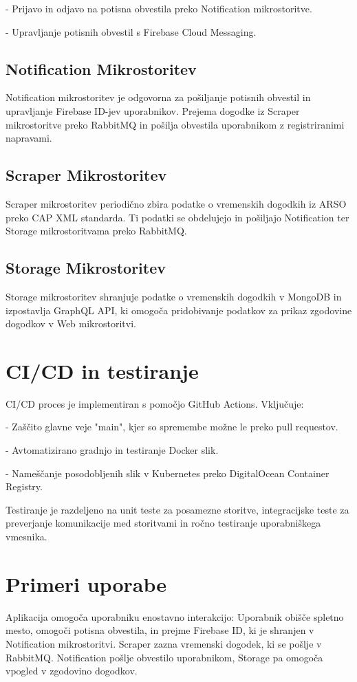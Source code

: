 \documentclass[a4paper,11pt]{article}
\begin{document}
- Prijavo in odjavo na potisna obvestila preko Notification mikrostoritve.

- Upravljanje potisnih obvestil s Firebase Cloud Messaging.

\subsection*{Notification Mikrostoritev}
Notification mikrostoritev je odgovorna za po\v{s}iljanje potisnih obvestil in upravljanje Firebase ID-jev uporabnikov. Prejema dogodke iz Scraper mikrostoritve preko RabbitMQ in po\v{s}ilja obvestila uporabnikom z registriranimi napravami.

\subsection*{Scraper Mikrostoritev}
Scraper mikrostoritev periodi\v{c}no zbira podatke o vremenskih dogodkih iz ARSO preko CAP XML standarda. Ti podatki se obdelujejo in po\v{s}iljajo Notification ter Storage mikrostoritvama preko RabbitMQ.

\subsection*{Storage Mikrostoritev}
Storage mikrostoritev shranjuje podatke o vremenskih dogodkih v MongoDB in izpostavlja GraphQL API, ki omogo\v{c}a pridobivanje podatkov za prikaz zgodovine dogodkov v Web mikrostoritvi.

\section*{CI/CD in testiranje}
CI/CD proces je implementiran s pomo\v{c}jo GitHub Actions. Vklju\v{c}uje:

- Za\v{s}\v{c}ito glavne veje "main", kjer so spremembe mo\v{z}ne le preko pull requestov.

- Avtomatizirano gradnjo in testiranje Docker slik.

- Name\v{s}\v{c}anje posodobljenih slik v Kubernetes preko DigitalOcean Container Registry.

Testiranje je razdeljeno na unit teste za posamezne storitve, integracijske teste za preverjanje komunikacije med storitvami in ro\v{c}no testiranje uporabni\v{s}kega vmesnika.

\section*{Primeri uporabe}
Aplikacija omogo\v{c}a uporabniku enostavno interakcijo:
Uporabnik obi\v{s}\v{c}e spletno mesto, omogo\v{c}i potisna obvestila, in prejme Firebase ID, ki je shranjen v Notification mikrostoritvi. Scraper zazna vremenski dogodek, ki se po\v{s}lje v RabbitMQ. Notification po\v{s}lje obvestilo uporabnikom, Storage pa omogo\v{c}a vpogled v zgodovino dogodkov.
\end{document}
